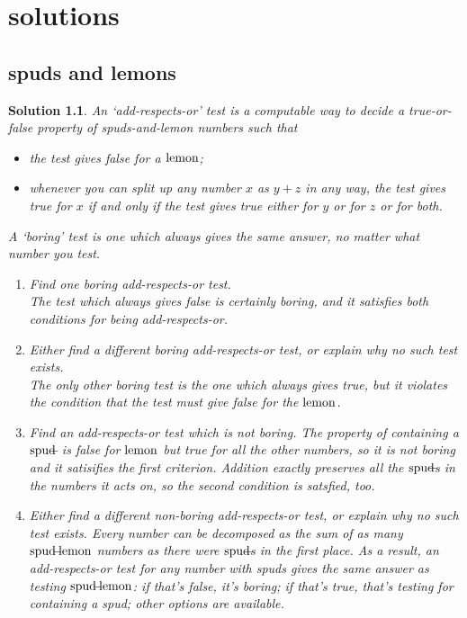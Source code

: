 \documentclass{book}
\begin{document}
\appendix


\chapter{solutions}

\newtheorem{sol}{Solution}[section]

\section{spuds and lemons}

\begin{sol}
  An `add-respects-or' test is a computable way to decide a true-or-false property of spuds-and-lemon numbers such that
  \begin{itemize}
  \item the test gives false for a $\mbox{lemon}$;
    \item whenever you can split up any number $x$ as $y+z$ in any way, the test gives true for $x$ if and only if the test gives true either for $y$ or for $z$ or for both.
  \end{itemize}
  A `boring' test is one which always gives the same answer, no matter what number you test.
  \begin{enumerate}
  \item Find one boring add-respects-or test.\\
    \emph{The test which always gives false is certainly boring, and it satisfies both conditions for being add-respects-or.}
  \item Either find a different boring add-respects-or test, or explain why no such test exists.\\
    \emph{The only other boring test is the one which always gives true, but it violates the condition that the test must give false for the $\mbox{lemon}$.}
  \item Find an add-respects-or test which is \emph{not} boring.
    \emph{The property of containing a $\mbox{spud}\!\!\!-\!\!\!\;$ is false for $\mbox{lemon}$ but true for all the other numbers, so it is not boring and it satisifies the first criterion. Addition exactly preserves all the $\mbox{spud}\!\!\!-\!\!\!\,$s in the numbers it acts on, so the second condition is satsfied, too.}
  \item Either find a different non-boring add-respects-or test, or explain why no such test exists.   \emph{Every number can be decomposed as the sum of as many $\mbox{spud}\!\!\!-\!\!\!\mbox{lemon}$ numbers as there were $\mbox{spud}\!\!\!-\!\!\!\,$s in the first place. As a result, an add-respects-or test for any number with spuds gives the same answer as testing $\mbox{spud}\!\!\!-\!\!\!\mbox{lemon}$: if that's false, it's boring; if that's true, that's testing for containing a spud; other options are available. }
  \end{enumerate}
\end{sol}
\end{document}
